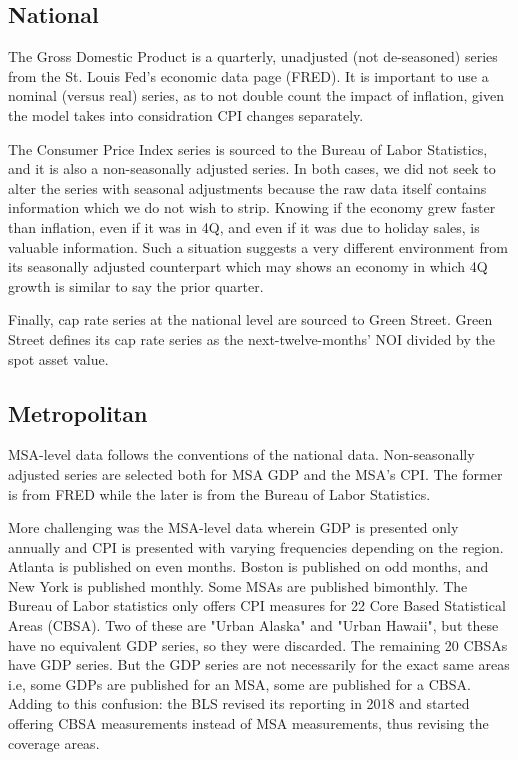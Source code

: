 \subsection{National}
The Gross Domestic Product is a quarterly, unadjusted (not de-seasoned) series from the St. Louis Fed's economic data page (FRED). It is important to use a nominal (versus real) series, as to not double count the impact of inflation, given the model takes into considration CPI changes separately.

The Consumer Price Index series is sourced to the Bureau of Labor Statistics, and it is also a non-seasonally adjusted series. In both cases, we did not seek to alter the series with seasonal adjustments because the raw data itself contains information which we do not wish to strip. Knowing if the economy grew faster than inflation, even if it was in 4Q, and even if it was due to holiday sales, is valuable information. Such a situation suggests a very different environment from its seasonally adjusted counterpart which may shows an economy in which 4Q growth is similar to say the prior quarter.

Finally, cap rate series at the national level are sourced to Green Street. Green Street defines its cap rate series as the next-twelve-months' NOI divided by the spot asset value. 

\subsection{Metropolitan}

MSA-level data follows the conventions of the national data. Non-seasonally adjusted series are selected both for MSA GDP and the MSA's CPI. The former is from FRED while the later is from the Bureau of Labor Statistics.

More challenging was the MSA-level data wherein GDP is presented only annually and CPI is presented with varying frequencies depending on the region. Atlanta is published on even months. Boston is published on odd months, and New York is published monthly. Some MSAs are published bimonthly. The Bureau of Labor statistics only offers CPI measures for 22 Core Based Statistical Areas (CBSA). Two of these are "Urban Alaska" and "Urban Hawaii", but these have no equivalent GDP series, so they were discarded. The remaining 20 CBSAs have GDP series. But the GDP series are not necessarily for the exact same areas i.e, some GDPs are published for an MSA, some are published for a CBSA. Adding to this confusion: the BLS revised its reporting in 2018 and started offering CBSA measurements instead of MSA measurements, thus revising the coverage areas.

